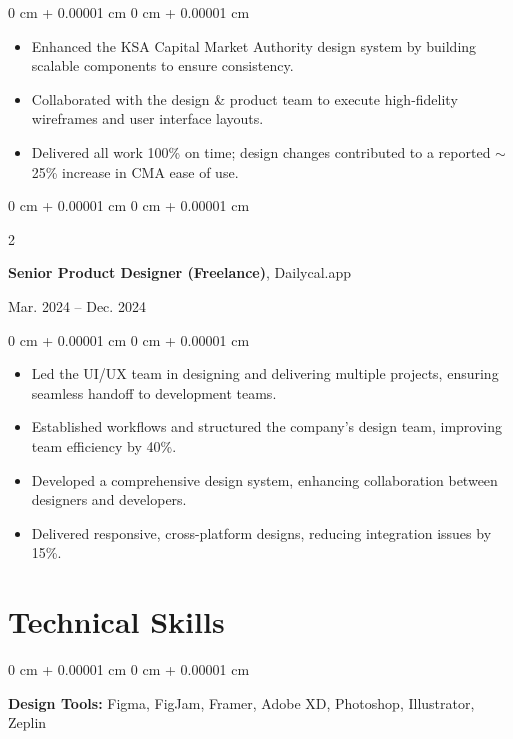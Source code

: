 \documentclass[10pt, letterpaper]{article}
\newenvironment{highlights}{
    \begin{itemize}[
        topsep=0.08 cm,
        parsep=0.10 cm,
        partopsep=0pt,
        itemsep=0.04 cm,
        leftmargin=0 cm + 10pt
    ]
}{
    \end{itemize}
} %
\newenvironment{onecolentry}{
    \begin{adjustwidth}{
        0 cm + 0.00001 cm
    }{
        0 cm + 0.00001 cm
    }
}{
    \end{adjustwidth}
} %
\newenvironment{twocolentry}[2][]{
    \onecolentry
    \def\secondColumn{#2}
    \setcolumnwidth{\fill, 4.5 cm}
    \begin{paracol}{2}
}{
    \switchcolumn \raggedleft \secondColumn
    \end{paracol}
    \endonecolentry
} %
\begin{document}
    \vspace{0.14 cm}
    \begin{onecolentry}
        \begin{highlights}
            \item Enhanced the KSA Capital Market Authority design system by building scalable components to ensure consistency.
            \item Collaborated with the design \& product team to execute high-fidelity wireframes and user interface layouts.
            \item Delivered all work 100\% on time; design changes contributed to a reported $\sim$25\% increase in CMA ease of use.
        \end{highlights}
    \end{onecolentry}

    \vspace{0.48 cm}

    \begin{twocolentry}{Mar. 2024 -- Dec. 2024}
        \textbf{Senior Product Designer (Freelance)}, Dailycal.app
    \end{twocolentry}

    \vspace{0.14 cm}
    \begin{onecolentry}
        \begin{highlights}
            \item Led the UI/UX team in designing and delivering multiple projects, ensuring seamless handoff to development teams.
            \item Established workflows and structured the company's design team, improving team efficiency by 40\%.
            \item Developed a comprehensive design system, enhancing collaboration between designers and developers.
            \item Delivered responsive, cross-platform designs, reducing integration issues by 15\%.
        \end{highlights}
    \end{onecolentry}

\section{Technical Skills}
\begin{onecolentry}
    \textbf{Design Tools:} Figma, FigJam, Framer, Adobe XD, Photoshop, Illustrator, Zeplin
\end{onecolentry}
\end{document}
